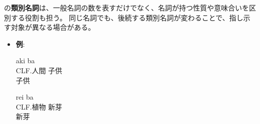\langname の\textbf{類別名詞}は、一般名詞の数を表すだけでなく、名詞が持つ性質や意味合いを区別する役割も担う。
同じ名詞でも、後続する類別名詞が変わることで、指し示す対象が異なる場合がある。

\begin{itemize}
    \item \textbf{例}:
    \begin{exe}
        \ex \gll aki ba\\
            CLF.人間 子供\\
        \glt 子供
    \end{exe}
    
    \begin{exe}
        \ex \gll rei ba\\
            CLF.植物 新芽\\
        \glt 新芽
    \end{exe}
\end{itemize}

